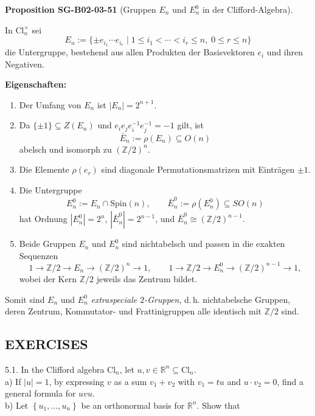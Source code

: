 \documentclass[10pt, letterpaper]{article}
\newcommand{\Cl}{\mathrm{Cl}}
\newcommand{\Spin}{\mathrm{Spin}}
\newcommand{\CustomHeading}[3]{%
  \par\medskip\noindent%
  \textbf{#1 #2} \textnormal{(#3)}.\enskip%
}
\newenvironment{PROP}[2]{\begin{unitbox}\CustomHeading{Proposition}{#1}{#2}}{\end{unitbox}}
\begin{document}
\begin{PROP}{SG-B02-03-51}{Gruppen $E_n$ und $E_n^0$ in der Clifford-Algebra}
In $\Cl_n^{\times}$ sei
\[
E_n := \{\pm e_{i_1}\cdots e_{i_r}\mid 1\le i_1<\cdots<i_r\le n,\;0\le r\le n\}
\]
die Untergruppe, bestehend aus allen Produkten der Basisvektoren $e_i$ und ihren Negativen.

\textbf{Eigenschaften:}
\begin{enumerate}[label=(\roman*)]
\item Der Umfang von $E_n$ ist $|E_n|=2^{n+1}$.
\item Da $\{\pm1\}\subseteq Z(E_n)$ und $e_i e_j e_i^{-1} e_j^{-1}=-1$ gilt, ist
      \[
      \bar E_n := \rho(E_n) \subseteq O(n)
      \]
      abelsch und isomorph zu $(\mathbb Z/2)^n$.
\item Die Elemente $\rho(e_r)$ sind diagonale Permutationsmatrizen mit Einträgen $\pm1$.
\item Die Untergruppe
      \[
      E_n^0 := E_n \cap \Spin(n),\qquad
      \bar E_n^0 := \rho(E_n^0)\subseteq SO(n)
      \]
      hat Ordnung $|E_n^0|=2^n$, $|\bar E_n^0|=2^{n-1}$, und
      \(\bar E_n^0\cong(\mathbb Z/2)^{n-1}\).
\item Beide Gruppen $E_n$ und $E_n^0$ sind nichtabelsch und passen in die exakten Sequenzen
      \[
      1\to \mathbb Z/2\to E_n\to (\mathbb Z/2)^n\to 1,\qquad
      1\to \mathbb Z/2\to E_n^0\to (\mathbb Z/2)^{n-1}\to 1,
      \]
      wobei der Kern $\mathbb Z/2$ jeweils das Zentrum bildet.
\end{enumerate}

Somit sind $E_n$ und $E_n^0$ \emph{extraspeciale $2$-Gruppen}, d.\,h. nichtabelsche Gruppen, deren Zentrum, Kommutator- und Frattinigruppen alle identisch mit $\mathbb Z/2$ sind.
\end{PROP}



\pagebreak


\subsection{EXERCISES}


5.1. In the Clifford algebra $\mathrm{Cl}_{n}$, let $u, v \in \mathbb{R}^{n} \subseteq \mathrm{Cl}_{n}$.\\
a) If $|u|=1$, by expressing $v$ as a sum $v_{1}+v_{2}$ with $v_{1}=t u$ and $u \cdot v_{2}=0$, find a general formula for $u v u$.\\
b) Let $\left\{u_{1}, \ldots, u_{n}\right\}$ be an orthonormal basis for $\mathbb{R}^{n}$. Show that
\end{document}
